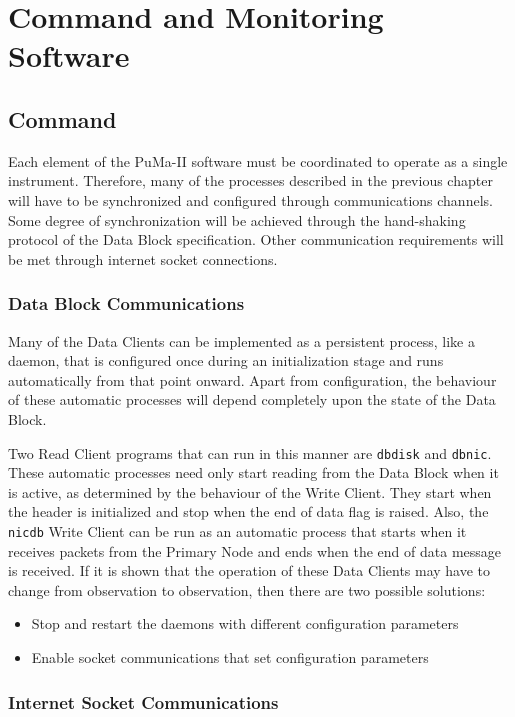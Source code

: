 \chapter{Command and Monitoring Software}

\section{Command}

Each element of the PuMa-II software must be coordinated to operate as
a single instrument.  Therefore, many of the processes described in
the previous chapter will have to be synchronized and configured
through communications channels.  Some degree of synchronization will
be achieved through the hand-shaking protocol of the Data Block
specification.  Other communication requirements will be met through
internet socket connections.

\subsection{Data Block Communications}

Many of the Data Clients can be implemented as a persistent process,
like a daemon, that is configured once during an initialization stage
and runs automatically from that point onward.  Apart from
configuration, the behaviour of these automatic processes will depend
completely upon the state of the Data Block.

Two Read Client programs that can run in this manner are {\tt dbdisk}
and {\tt dbnic}.  These automatic processes need only start reading
from the Data Block when it is active, as determined by the behaviour
of the Write Client.  They start when the header is initialized and
stop when the end of data flag is raised.
Also, the {\tt nicdb} Write Client can be run as an automatic process
that starts when it receives packets from the Primary Node and ends
when the end of data message is received.
If it is shown that the operation of these Data Clients may have to
change from observation to observation, then there are two possible
solutions:
\begin{itemize}
\item Stop and restart the daemons with different configuration parameters
\item Enable socket communications that set configuration parameters
\end{itemize}

\subsection{Internet Socket Communications}

